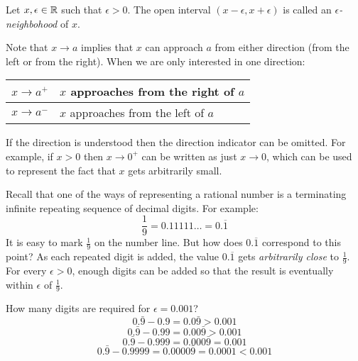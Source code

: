 \documentclass[letterpaper,12pt,fleqn]{article}
\newcommand{\e}{\epsilon}
\begin{document}
\begin{definition}[Neighborhood]
  Let \(x,\e\in\R\) such that \(\e>0\).  The open interval \((x-\e,x+\e)\) is called an \emph{\(\e\)-neighbohood}
  of \(x\).
\end{definition}

\begin{notation}
Note that \(x\to a\) implies that \(x\) can approach \(a\) from either direction (from the left or from the right).
When we are only interested in one direction:

\bigskip

\begin{center}
  \begin{tabular}{|c|l|}
    \hline
    \(x\to a^+\) & \(x\) approaches from the right of \(a\) \\
    \hline
    \(x\to a^-\) & \(x\) approaches from the left of \(a\) \\
    \hline
  \end{tabular}
\end{center}

\bigskip

If the direction is understood then the direction indicator can be omitted.  For example, if \(x>0\) then
\(x\to0^+\) can be written as just \(x\to0\), which can be used to represent the fact that \(x\) gets arbitrarily
small.
\end{notation}

\newpage

\begin{example}
  Recall that one of the ways of representing a rational number is a terminating infinite repeating sequence of
  decimal digits.  For example:
  \[\frac{1}{9}=0.11111\ldots=0.\overline{1}\]
  It is easy to mark \(\frac{1}{9}\) on the number line.  But how does \(0.\overline{1}\) correspond to this point?
  As each repeated digit is added, the value \(0.\overline{1}\) gets \emph{arbitrarily close} to \(\frac{1}{9}\).
  For every \(\e>0\), enough digits can be added so that the result is eventually within \(\e\) of \(\frac{1}{9}\).

  \bigskip

  \begin{center}
  \end{center}

  How many digits are required for \(\e=0.001\)?
  \[0.\bar{9}-0.9=0.0\bar{9}>0.001\]
  \[0.\bar{9}-0.99=0.00\bar{9}>0.001\]
  \[0.\bar{9}-0.999=0.000\bar{9}=0.001\]
  \[0.\bar{9}-0.9999=0.0000\bar{9}=0.0001<0.001\]
\end{example}
\end{document}
